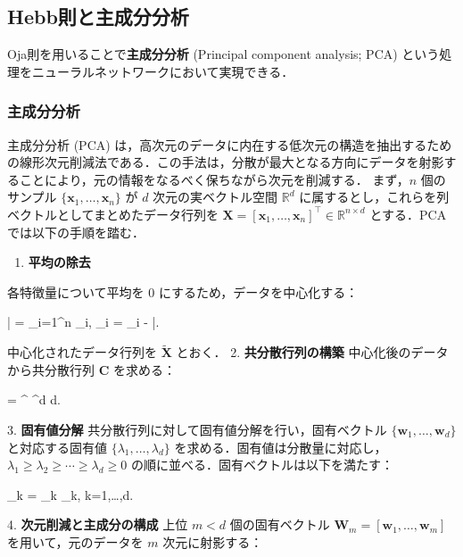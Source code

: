 \subsection{Hebb則と主成分分析}
Oja則を用いることで\textbf{主成分分析} (Principal component analysis; PCA) という処理をニューラルネットワークにおいて実現できる．
\subsubsection{主成分分析}
主成分分析 (PCA) は，高次元のデータに内在する低次元の構造を抽出するための線形次元削減法である．この手法は，分散が最大となる方向にデータを射影することにより，元の情報をなるべく保ちながら次元を削減する．
まず，$n$ 個のサンプル $\{\mathbf{x}_1, \dots, \mathbf{x}_n\}$ が $d$ 次元の実ベクトル空間 $\mathbb{R}^d$ に属するとし，これらを列ベクトルとしてまとめたデータ行列を $\mathbf{X} = [\mathbf{x}_1, \dots, \mathbf{x}_n]^\top \in \mathbb{R}^{n \times d}$ とする．PCA では以下の手順を踏む．
\begin{enumerate}
\item \textbf{平均の除去}  
\end{enumerate}
   各特徴量について平均を 0 にするため，データを中心化する：
   
   \bar{} =  \sum_{i=1}^n _i, \quad {}_i = _i - \bar{}.
   
   中心化されたデータ行列を $\tilde{\mathbf{X}}$ とおく．
2. \textbf{共分散行列の構築}  
   中心化後のデータから共分散行列 $\mathbf{C}$ を求める：
   
    =  ^\top {} \in {}^{d \times d}.
   
3. \textbf{固有値分解}  
   共分散行列に対して固有値分解を行い，固有ベクトル $\{\mathbf{w}_1, \dots, \mathbf{w}_d\}$ と対応する固有値 $\{\lambda_1, \dots, \lambda_d\}$ を求める．固有値は分散量に対応し，$\lambda_1 \geq \lambda_2 \geq \cdots \geq \lambda_d \geq 0$ の順に並べる．固有ベクトルは以下を満たす：
   
    _k = \lambda_k _k, \quad k=1,\dots,d.
   
4. \textbf{次元削減と主成分の構成}  
   上位 $m < d$ 個の固有ベクトル $\mathbf{W}_m = [\mathbf{w}_1, \dots, \mathbf{w}_m]$ を用いて，元のデータを $m$ 次元に射影する：
   
